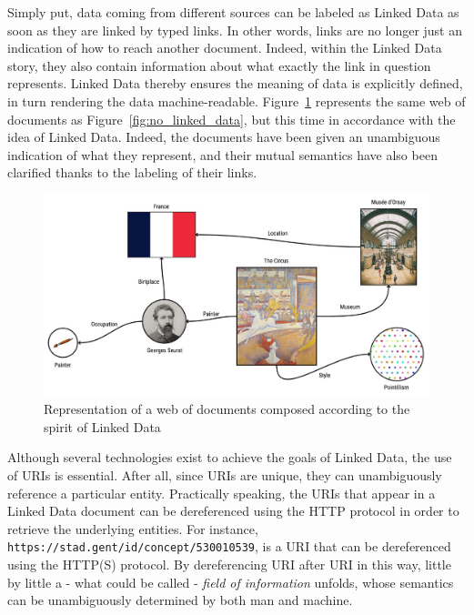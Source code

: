 Simply put, data coming from different sources can be labeled as Linked Data as soon as they are linked by typed links. In other words, links are no longer just an indication of how to reach another document. Indeed, within the Linked Data story, they also contain information about what exactly the link in question represents. Linked Data thereby ensures the meaning of data is explicitly defined, in turn rendering the data machine-readable. Figure~\ref{fig:linked_data} represents the same web of documents as Figure~\ref{fig:no_linked_data}, but this time in accordance with the idea of Linked Data. Indeed, the documents have been given an  unambiguous indication of what they represent, and their mutual semantics have also been clarified thanks to the labeling of their links. \citep{bizer2011linked}

\begin{figure}[htbp]
    \centering
	\includegraphics[width=\textwidth]{images/linked_data.jpg}
    \captionsetup{justification=centering}
	\caption{Representation of a web of documents composed according to the spirit of Linked Data}
	\label{fig:linked_data}
\end{figure}

Although several technologies exist to achieve the goals of Linked Data, the use of URIs is essential. After all, since URIs are unique, they can unambiguously reference a particular entity. Practically speaking, the URIs that appear in a Linked Data document can be dereferenced using the HTTP protocol in order to retrieve the underlying entities. For instance, \texttt{https://stad.gent/id/concept/530010539}, is a URI that can be dereferenced using the HTTP(S) protocol. By dereferencing URI after URI in this way, little by little a - what could be called - \textit{field of information} unfolds, whose semantics can be unambiguously determined by both man and machine. \citep{bizer2011linked}

